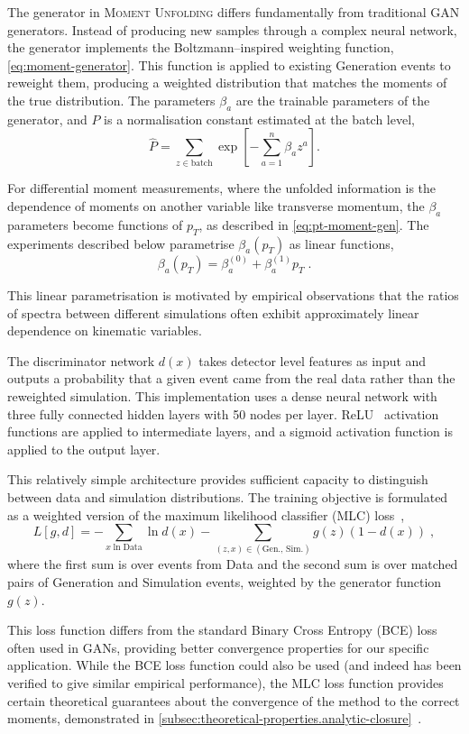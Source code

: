     The generator in \textsc{Moment Unfolding} differs fundamentally from traditional GAN generators.
    Instead of producing new samples through a complex neural network, the generator implements the Boltzmann--inspired weighting function, \cref{eq:moment-generator}.
    This function is applied to existing Generation events to reweight them, producing a weighted distribution that matches the moments of the true distribution.
    The parameters $\beta_a$ are the trainable parameters of the generator, and $P$ is a normalisation constant estimated at the batch level,
    \[
        \hat P = \sum_{z \in \text{batch}} \exp\left[-\sum_{a=1}^n\beta_a z^a\right].
    \]

    For differential moment measurements, where the unfolded information is the dependence of moments on another variable like transverse momentum, the $\beta_a$ parameters become functions of $p_T$, as described in \cref{eq:pt-moment-gen}.
    The experiments described below parametrise $\beta_a(p_T)$ as linear functions, 
    \[
        \beta_a(p_T) = \beta_a^{(0)} + \beta_a^{(1)}p_T\;.
    \]
    
    This linear parametrisation is motivated by empirical observations that the ratios of spectra between different simulations often exhibit approximately linear dependence on kinematic variables.

    The discriminator network $d(x)$ takes detector level features as input and outputs a probability that a given event came from the real data rather than the reweighted simulation.
    This implementation uses a dense neural network with three fully connected hidden layers with 50 nodes per layer.
    ReLU~\cite{Householder1941ALemmas} activation functions are applied to intermediate layers, and a sigmoid activation function is applied to the output layer.

    This relatively simple architecture provides sufficient capacity to distinguish between data and simulation distributions.
%
    The training objective is formulated as a weighted version of the maximum likelihood classifier (MLC) loss~\cite{Stoye2018Likelihood-freeEstimator},
    \[
        \label{eq:numericloss}
        L[g,d] = -\sum_{x \ln \text{Data}} \ln d(x) - \sum_{(z,x) \in (\text{Gen., Sim.})} g(z)(1-d(x))\;,
    \]
    where the first sum is over events from Data and the second sum is over matched pairs of Generation and Simulation events, weighted by the generator function $g(z)$.

    This loss function differs from the standard Binary Cross Entropy (BCE) loss often used in GANs, providing better convergence properties for our specific application.
    While the BCE loss function could also be used (and indeed has been verified to give similar empirical performance), the MLC loss function provides certain theoretical guarantees about the convergence of the method to the correct moments, demonstrated in \cref{subsec:theoretical-properties.analytic-closure}~\cite{desai2024moment}.
